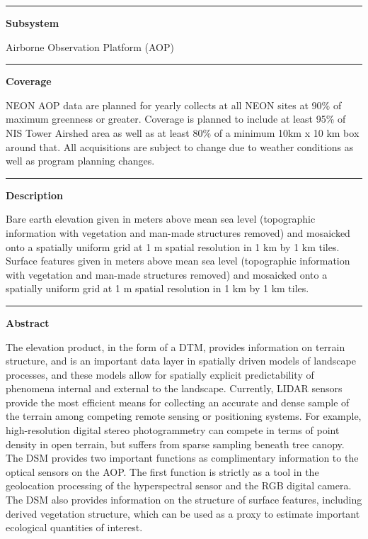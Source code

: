 \documentclass[]{article}
\begin{document}
\begin{center}\rule{0.5\linewidth}{\linethickness}\end{center}

\textbf{Subsystem}

Airborne Observation Platform (AOP)

\begin{center}\rule{0.5\linewidth}{\linethickness}\end{center}

\textbf{Coverage}

NEON AOP data are planned for yearly collects at all NEON sites at 90\%
of maximum greenness or greater. Coverage is planned to include at least
95\% of NIS Tower Airshed area as well as at least 80\% of a minimum
10km x 10 km box around that. All acquisitions are subject to change due
to weather conditions as well as program planning changes.

\begin{center}\rule{0.5\linewidth}{\linethickness}\end{center}

\textbf{Description}

Bare earth elevation given in meters above mean sea level (topographic
information with vegetation and man-made structures removed) and
mosaicked onto a spatially uniform grid at 1 m spatial resolution in 1
km by 1 km tiles. Surface features given in meters above mean sea level
(topographic information with vegetation and man-made structures
removed) and mosaicked onto a spatially uniform grid at 1 m spatial
resolution in 1 km by 1 km tiles.

\begin{center}\rule{0.5\linewidth}{\linethickness}\end{center}

\textbf{Abstract}

The elevation product, in the form of a DTM, provides information on
terrain structure, and is an important data layer in spatially driven
models of landscape processes, and these models allow for spatially
explicit predictability of phenomena internal and external to the
landscape. Currently, LIDAR sensors provide the most efficient means for
collecting an accurate and dense sample of the terrain among competing
remote sensing or positioning systems. For example, high-resolution
digital stereo photogrammetry can compete in terms of point density in
open terrain, but suffers from sparse sampling beneath tree canopy. The
DSM provides two important functions as complimentary information to the
optical sensors on the AOP. The first function is strictly as a tool in
the geolocation processing of the hyperspectral sensor and the RGB
digital camera. The DSM also provides information on the structure of
surface features, including derived vegetation structure, which can be
used as a proxy to estimate important ecological quantities of interest.
\end{document}

